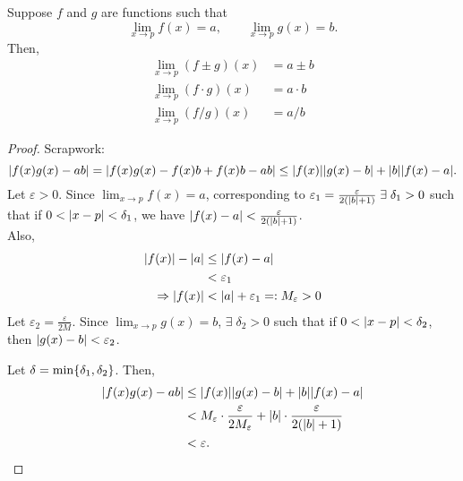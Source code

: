 \begin{thm} \label{thm:limit:laws}
    Suppose $f$ and $g$ are functions such that \[
        \lim_{x \to p} f(x) = a, \qquad \lim_{x \to p} g(x) = b.
    \] Then,
    \begin{align}
        \lim_{x \to p} (f \pm g)(x) &= a \pm b \\
        \lim_{x \to p} (f \cdot g)(x) &= a \cdot b \\
        \lim_{x \to p} (f/g)(x) &= a/b
    \end{align}
\end{thm}
\begin{proof}
    Scrapwork: \[
        \abs{f(x) g(x) - ab} = \abs{f(x)g(x) - f(x) b + f(x) b - ab} \leq \abs{f(x)} \abs{g(x) - b} + \abs{b} \abs{f(x) - a}.
    \]
    Let $\varepsilon > 0$. Since $\lim_{x \to p} f(x) = a$, corresponding to $\varepsilon_{1} = \frac{\varepsilon}{2(\abs{ b } + 1)} \;\exists\; \delta_{1} > 0 $ such that if $0 < \abs{ x - p } < \delta_{1}$, we have $\abs{ f(x) - a } < \frac{\varepsilon}{2(\abs{ b } + 1)}$. \\
    Also, \begin{align*}
        \abs{ f(x) } - \abs{ a} &\leq  \abs{ f(x) - a } \\
        &< \varepsilon_{1} \\
        \implies \abs{ f(x) } &< \abs{ a } + \varepsilon_{1} =: M_{\varepsilon} > 0
    \end{align*}
    Let $\varepsilon_{2} = \frac{\varepsilon}{2M}$. Since $\lim_{x \to p} g(x) = b$, $\exists\; \delta_{2} > 0$ such that if $0 < \abs{ x - p } < \delta_{2}$, then $\abs{ g(x) - b } < \varepsilon_{2}$.

    Let $\delta = \min\set{\delta_{1}, \delta_{2}}$. Then,
    \begin{align*}
        \abs{ f(x) g(x) - ab } &\leq \abs{ f(x) } \abs{ g(x) - b} + \abs{ b } \abs{ f(x) - a } \\
        &< M_{\varepsilon} \cdot \frac{\varepsilon}{2 M_{\varepsilon}} + \abs{ b } \cdot \frac{\varepsilon}{2(\abs{ b} + 1)} \\
        &< \varepsilon. \qedhere
    \end{align*}
\end{proof}
